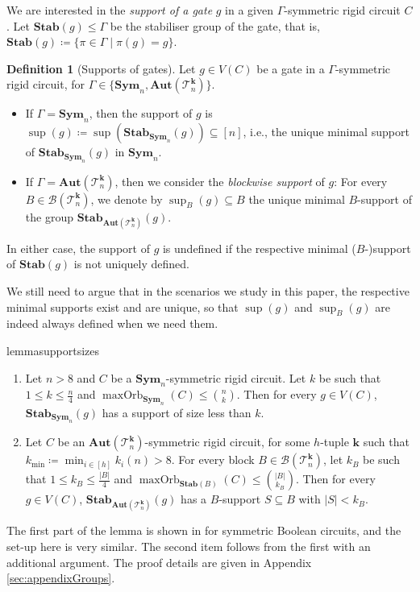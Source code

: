 \documentclass[11pt]{article}
\DeclareMathOperator{\supp}{sup}
\newcommand{\Aut}{\mathbf{Aut}}
\newcommand{\Sym}{\mathbf{Sym}}
\newcommand{\Stab}{\mathbf{Stab}}
\newcommand{\Bb}{{\mathcal B}}
\newcommand{\Tt}{{\mathcal T}}
\theoremstyle{definition}
\newtheorem{definition}{Definition}[section]
\theoremstyle{plain}
\theoremstyle{remark}
\theoremstyle{remark}
\newcommand{\maxorb}{\operatorname{maxOrb}}
\begin{document}
We are interested in the \emph{support of a gate} $g$ in a given $\Gamma$-symmetric rigid circuit $C$. Let $\Stab(g) \leq \Gamma$ be the stabiliser group of the gate, that is, $\Stab(g) \coloneqq \{ \pi \in \Gamma \mid \pi(g) = g\}$.
\begin{definition}[Supports of gates]
	\label{def:support}
	Let $g \in V(C)$ be a gate in a $\Gamma$-symmetric rigid circuit, for $\Gamma \in \{\Sym_n, \Aut(\Tt_n^{\boldsymbol{k}}) \}$.
	\begin{itemize}
		\item If $\Gamma = \Sym_n$, then the support of $g$ is $\supp(g) \coloneqq \supp(\Stab_{\Sym_n}(g)) \subseteq [n]$, i.e., the unique minimal support of $\Stab_{\Sym_n}(g)$ in $\Sym_n$. 
		\item If $\Gamma = \Aut(\Tt_n^{\boldsymbol{k}})$, then we consider the \emph{blockwise support} of $g$: For every $B \in \Bb(\Tt_n^{\boldsymbol{k}})$, we denote by $\supp_B(g) \subseteq B$ the unique minimal $B$-support of the group $\Stab_{\Aut(\Tt_n^{\boldsymbol{k}})}(g)$.
	\end{itemize}	
	In either case, the support of $g$ is undefined if the respective minimal ($B$-)support of $\Stab(g)$ is not uniquely defined.
\end{definition}	
We still need to argue that in the scenarios we study in this paper, the respective minimal supports exist and are unique, so that $\supp(g)$ and $\supp_B(g)$ are indeed always defined when we need them.
\begin{restatable}{lemma}{supportsizes}
\label{lem:supportSizes}	
\begin{enumerate}
\item Let $n > 8$ and $C$ be a $\Sym_n$-symmetric rigid circuit. Let $k$ be such that $1 \leq k \leq \frac{n}{4}$ and $\maxorb_{\Sym_n}(C) \leq \binom{n}{k}$.
Then for every $g \in V(C)$, $\Stab_{\Sym_n}(g)$ has a support of size less than $k$. 
\item Let $C$ be an $\Aut(\Tt_n^{\boldsymbol{k}})$-symmetric rigid circuit, for some $h$-tuple $\boldsymbol{k}$ such that $k_{\text{min}} \coloneqq \min_{i \in [h]} k_i(n)  > 8$.
For every block $B \in \Bb(\Tt_n^{\boldsymbol{k}})$, let $k_B$ be such that $1 \leq k_B \leq \frac{|B|}{4}$ and $\maxorb_{\Stab(B)}(C) \leq \binom{|B|}{k_B}$. Then for every $g \in V(C)$, $\Stab_{\Aut(\Tt_n^{\boldsymbol{k}})}(g)$ has a $B$-support $S \subseteq B$ with $|S| < k_B$.
\end{enumerate}
\end{restatable}
The first part of the lemma is shown in \cite[Theorem 14]{dawar_symmetric_2024} for symmetric Boolean circuits, and the set-up here is very similar. The second item follows from the first with an additional argument. The proof details are given in Appendix \ref{sec:appendixGroups}.
\end{document}

